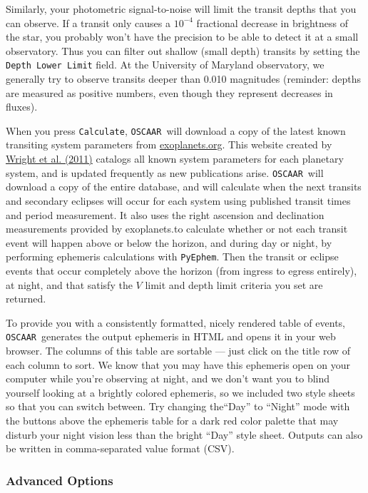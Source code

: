 \documentclass[a4paper]{article}
\newcommand{\code}[1]{\texttt{#1}}
\newcommand{\oscaar}{\code{OSCAAR}~}
\begin{document}
Similarly, your photometric signal-to-noise will limit the transit depths that you can observe. If a transit only causes a $10^{-4}$ fractional decrease in brightness of the star, you probably won't have the precision to be able to detect it at a small observatory. Thus you can filter out shallow (small depth) transits by setting the \code{Depth Lower Limit} field. At the University of Maryland observatory, we generally try to observe transits deeper than 0.010 magnitudes (reminder: depths are measured as positive numbers, even though they represent decreases in fluxes).

When you press \code{Calculate}, \oscaar will download a copy of the latest known transiting system parameters from \href{http://www.exoplanets.org/}{exoplanets.org}. This website created by \href{http://adsabs.harvard.edu/abs/2011PASP..123..412W}{Wright et al. (2011)} catalogs all known system parameters for each planetary system, and is updated frequently as new publications arise. \oscaar will download a copy of the entire database, and will calculate when the next transits and secondary eclipses will occur for each system using published transit times and period measurement. It also uses the right ascension and declination measurements provided by exoplanets.\@org to calculate whether or not each transit event will happen above or below the horizon, and during day or night, by performing ephemeris calculations with \code{PyEphem}. Then the transit or eclipse events that occur completely above the horizon (from ingress to egress entirely), at night, and that satisfy the $V$ limit and depth limit criteria you set are returned. 

To provide you with a consistently formatted, nicely rendered table of events, \oscaar generates the output ephemeris in HTML and opens it in your web browser. The columns of this table are sortable --- just click on the title row of each column to sort. We know that you may have this ephemeris open on your computer while you're observing at night, and we don't want you to blind yourself looking at a brightly colored ephemeris, so we included two style sheets so that you can switch between. Try changing the``Day'' to ``Night'' mode with the buttons above the ephemeris table for a dark red color palette that may disturb your night vision less than the bright ``Day'' style sheet. Outputs can also be written in comma-separated value format (CSV).

\subsubsection{Advanced Options}
\end{document}

